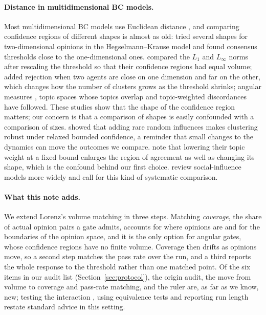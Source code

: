 \documentclass[11pt]{article}
\begin{document}
\paragraph{Distance in multidimensional BC models.}
Most multidimensional BC models use Euclidean distance \citep{lorenz2007}, and comparing confidence regions of different shapes is almost as old: \citet{fortunato2005} tried several shapes for two-dimensional opinions in the Hegselmann--Krause model and found consensus thresholds close to the one-dimensional ones.
\citet{lorenz2008} compared the $L_1$ and $L_\infty$ norms after rescaling the threshold so that their confidence regions had equal volume; \citet{huet2008} added rejection when two agents are close on one dimension and far on the other, which changes how the number of clusters grows as the threshold shrinks; angular measures \citep{schweighofer2020}, topic spaces whose topics overlap \citep{baumann2021} and topic-weighted discordances \citep{li2026} have followed.
These studies show that the shape of the confidence region matters; our concern is that a comparison of shapes is easily confounded with a comparison of sizes.
\citet{kurahashi2016} showed that adding rare random influences makes clustering robust under relaxed bounded confidence, a reminder that small changes to the dynamics can move the outcomes we compare.
\citet{li2026} note that lowering their topic weight at a fixed bound enlarges the region of agreement as well as changing its shape, which is the confound behind our first choice.
\citet{flache2017} review social-influence models more widely and call for this kind of systematic comparison.

\paragraph{What this note adds.}
We extend Lorenz's volume matching in three steps.
Matching \emph{coverage}, the share of actual opinion pairs a gate admits, accounts for where opinions are and for the boundaries of the opinion space, and it is the only option for angular gates, whose confidence regions have no finite volume.
Coverage then drifts as opinions move, so a second step matches the pass rate over the run, and a third reports the whole response to the threshold rather than one matched point.
Of the six items in our audit list (Section~\ref{sec:protocol}), the origin audit, the move from volume to coverage and pass-rate matching, and the ruler are, as far as we know, new; testing the interaction \citep{gelman2006}, using equivalence tests \citep{lakens2017} and reporting run length restate standard advice in this setting.
\end{document}
